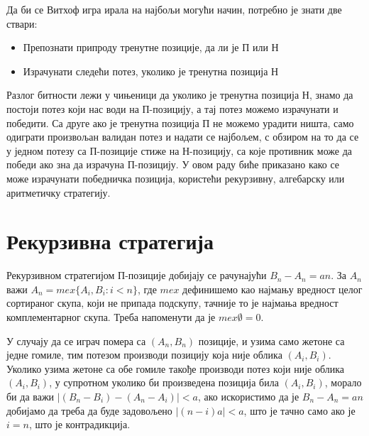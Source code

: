 \documentclass[a4paper]{article}
\begin{document}
Да би се Витхоф игра ирала на најбољи могући начин, потребно је знати две ствари:
\begin{itemize}
	\item Препознати припроду тренутне позиције, да ли је П или Н
	\item Израчунати следећи потез, уколико је тренутна позиција Н
\end{itemize}

Разлог битности лежи у чињеници да уколико је тренутна позиција Н, знамо да постоји потез који нас води на П-позицију, а тај потез можемо израчунати и победити. Са друге ако је тренутна позиција П не можемо урадити ништа, само одиграти произвољан валидан потез и надати се најбољем, с обзиром на то да се у једном потезу са П-позиције стиже на Н-позицију, са које противник може да победи ако зна да израчуна П-позицију. У овом раду биће приказано како се може израчунати победничка позиција, користећи рекурзивну, алгебарску или аритметичку стратегију.

\section{Рекурзивна стратегија}
\label{sec:rekurzivna_strategija}

Рекурзивном стратегијом П-позиције добијају се рачунајући $ B_{n} - A_{n} = an $. За $ A_n $ важи $ A_{n} = mex \{ A_{i}, B_{i} : i < n \} $, где $ mex $ дефинишемо као најмању вредност целог сортираног скупа, који не припада подскупу, тачније то је најмања вредност комплементарног скупа. Треба напоменути да је $ mex \emptyset = 0 $.

У случају да се играч помера са $ (A_{n}, B_{n}) $ позиције, и узима само жетоне са једне гомиле, тим потезом производи позицију која није облика $ (A_{i}, B_{i}) $. Уколико узима жетоне са обе гомиле такође производи потез који није облика $ (A_{i}, B_{i}) $, у супротном уколико би произведена позиција била $ (A_{i}, B_{i}) $, морало би да важи $ |(B_{n} - B_{i}) - (A_{n}-A_{i})| < a $, ако искористимо да је $ B_{n} - A_{n} = an $ добијамо да треба да буде задовољено $ |(n-i)a| < a $, што је тачно само ако је $ i = n $, што је контрадикција. 
\end{document}
